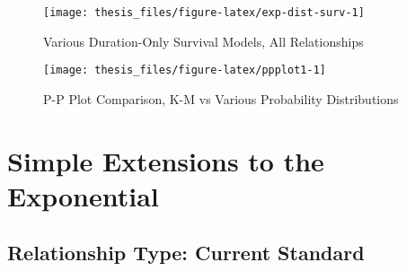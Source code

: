 \documentclass [11pt, proquest] {uwthesis}[2015/03/03]
\begin{document}
\begin{figure}

{\centering \texttt{[image: thesis\_files/figure-latex/exp-dist-surv-1]} 

}

\caption{Various Duration-Only Survival Models, All Relationships}\label{fig:exp-dist-surv}
\end{figure}
\begin{figure}

{\centering \texttt{[image: thesis\_files/figure-latex/ppplot1-1]} 

}

\caption{P-P Plot Comparison, K-M vs Various Probability Distributions}\label{fig:ppplot1}
\end{figure}
\hypertarget{simple-extensions-to-the-exponential}{%
\section{Simple Extensions to the Exponential}\label{simple-extensions-to-the-exponential}}

\hypertarget{relationship-type-current-standard}{%
\subsection{Relationship Type: Current Standard}\label{relationship-type-current-standard}}
\end{document}
